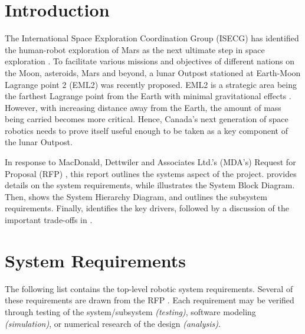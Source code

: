 \documentclass[12pt, letterpaper]{article}
\begin{document}
\cfoot{\normalsize\thepage}
\onehalfspacing
\newpage

\newpage

\newpage
\singlespacing
\tableofcontents
\onehalfspacing
\newpage
\listoffigures
\listoftables

\clearpage
\cfoot{\normalsize\thepage}
\section{Introduction}
\label{sect:intro}
The International Space Exploration Coordination Group (ISECG) has identified the human-robot exploration of Mars as the next ultimate step in space exploration \cite{RFP}. To facilitate various missions and objectives of different nations on the Moon, asteroids, Mars and beyond, a lunar Outpost stationed at Earth-Moon Lagrange point 2 (EML2) was recently proposed. EML2 is a strategic area being the farthest Lagrange point from the Earth with minimal gravitational effects \cite{HphyEML}. However, with increasing distance away from the Earth, the amount of mass being carried becomes more critical. Hence, Canada's next generation of space robotics needs to prove itself useful enough to be taken as a key component of the lunar Outpost.

In response to MacDonald, Dettwiler and Associates Ltd.'s (MDA's) Request for Proposal (RFP) \cite{RFP}, this report outlines the systems aspect of the project.  provides details on the system requirements, while  illustrates the System Block Diagram. Then,  shows the System Hierarchy Diagram, and  outlines the subsystem requirements. Finally,  identifies the key drivers, followed by a discussion of the important trade-offs in .
\section{System Requirements}
\label{sect:sysreq}
The following list contains the top-level robotic system requirements. Several of these requirements are drawn from the RFP \cite{RFP}. Each requirement may be verified through testing of the system/subsystem \textit{(testing)}, software modeling \textit{(simulation)}, or numerical research of the design \textit{(analysis)}.
\end{document}
